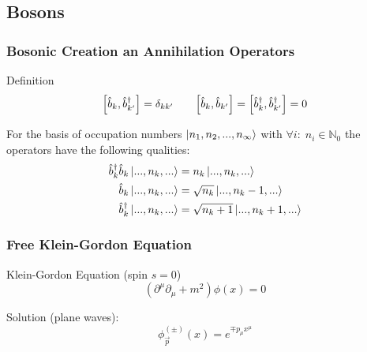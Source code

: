
	\subsection{Bosons}
		\subsubsection{Bosonic Creation an Annihilation Operators}
		\label{Sec:BosonicCreationAndAnnihilationOperators}
			Definition
			\begin{equation}
				\comm{\hat{b}_k}{\hat{b}_{k'}^\dagger} = \delta_{kk'}
				\hspace{20pt}
				\comm{\hat{b}_k}{\hat{b}_{k'}} = \comm{\hat{b}_k^\dagger}{\hat{b}_{k'}^\dagger} = 0
			\end{equation}

			\noindent
			For the basis of occupation numbers $\Ket{n_1, n_2, ..., n_\infty}$ with $\forall i:\;n_i\in \mathbb{N}_0$ the operators have the following qualities:
			\begin{equation}
				\begin{aligned}
					\hat{b}_k^\dagger \hat{b}_k \Ket{...,n_k,...} &= n_k \Ket{...,n_k,...} \\
					\hat{b}_k \Ket{...,n_k,...} &= \sqrt{n_k} \Ket{...,n_k-1,...} \\
					\hat{b}_k^\dagger \Ket{...,n_k,...} &= \sqrt{n_k+1} \Ket{...,n_k+1,...} \\
				\end{aligned}
			\end{equation}

		\subsubsection{Free Klein-Gordon Equation}
			\noindent
			Klein-Gordon Equation (spin $s=0$)
			\begin{equation}
				\left(\partial^\mu\partial_\mu+m^2\right) \phi(x) = 0
			\end{equation}

			\noindent
			Solution (plane waves):
			\begin{equation}
				{\phi}^{ ( \pm ) }_{\vec{p}} (x) = e^{\mp p_\mu x^\mu}
			\end{equation}

